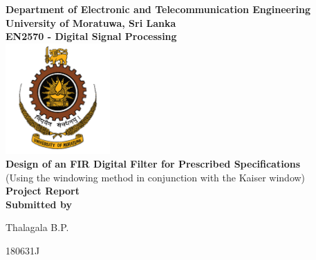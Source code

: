 \begin{titlepage}
\center %

\textbf{\large Department of Electronic and Telecommunication Engineering}\\[0.5cm]
\textbf{\Large University of Moratuwa, Sri Lanka}\\[1cm]
\textbf{\large EN2570 - Digital Signal Processing}\\[2cm]
\includegraphics[width=0.3\textwidth]{figures/uomlogo}\\[2cm]

	
\textbf{\Huge Design of an FIR Digital Filter for Prescribed Specifications}\\[0.2cm]
{\Large (Using the windowing method in conjunction with the Kaiser window)}\\[0.5cm]
\textbf{\Large Project Report}\\[5cm]



\vfill
\textbf{\large Submitted by}\\[0.5cm]
\begin{minipage}{0.2\textwidth}
	\begin{flushleft}
		{\large Thalagala B.P.}\\[4mm]		
	\end{flushleft}
\end{minipage}
\hspace{2mm}
\begin{minipage}{0.2\textwidth}
	\begin{flushright}
		{\large 180631J }\\[4mm]
	\end{flushright}
\end{minipage}\\[1.5cm]


\end{titlepage}
